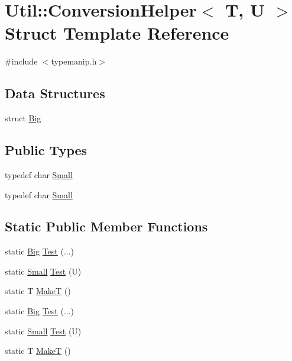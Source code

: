\hypertarget{structUtil_1_1Private_1_1ConversionHelper}{}\section{Util\+:\+:Conversion\+Helper$<$ T, U $>$ Struct Template Reference}
\label{structUtil_1_1Private_1_1ConversionHelper}


{\ttfamily \#include $<$typemanip.\+h$>$}

\subsection*{Data Structures}
\begin{DoxyCompactItemize}
\item 
struct \mbox{\hyperlink{structUtil_1_1Private_1_1ConversionHelper_1_1Big}{Big}}
\end{DoxyCompactItemize}
\subsection*{Public Types}
\begin{DoxyCompactItemize}
\item 
typedef char \mbox{\hyperlink{structUtil_1_1Private_1_1ConversionHelper_aaaf6583019b5246d4676b56923632385}{Small}}
\item 
typedef char \mbox{\hyperlink{structUtil_1_1Private_1_1ConversionHelper_aaaf6583019b5246d4676b56923632385}{Small}}
\end{DoxyCompactItemize}
\subsection*{Static Public Member Functions}
\begin{DoxyCompactItemize}
\item 
static \mbox{\hyperlink{structUtil_1_1Private_1_1ConversionHelper_1_1Big}{Big}} \mbox{\hyperlink{structUtil_1_1Private_1_1ConversionHelper_a70eb55dfb70dbf3459524083d35e350b}{Test}} (...)
\item 
static \mbox{\hyperlink{structUtil_1_1Private_1_1ConversionHelper_aaaf6583019b5246d4676b56923632385}{Small}} \mbox{\hyperlink{structUtil_1_1Private_1_1ConversionHelper_aeee49a75a44a57a9fec054caca088db9}{Test}} (U)
\item 
static T \mbox{\hyperlink{structUtil_1_1Private_1_1ConversionHelper_a5515ec18074242f117a5a1cf91ca3a7d}{MakeT}} ()
\item 
static \mbox{\hyperlink{structUtil_1_1Private_1_1ConversionHelper_1_1Big}{Big}} \mbox{\hyperlink{structUtil_1_1Private_1_1ConversionHelper_a70eb55dfb70dbf3459524083d35e350b}{Test}} (...)
\item 
static \mbox{\hyperlink{structUtil_1_1Private_1_1ConversionHelper_aaaf6583019b5246d4676b56923632385}{Small}} \mbox{\hyperlink{structUtil_1_1Private_1_1ConversionHelper_aeee49a75a44a57a9fec054caca088db9}{Test}} (U)
\item 
static T \mbox{\hyperlink{structUtil_1_1Private_1_1ConversionHelper_a5515ec18074242f117a5a1cf91ca3a7d}{MakeT}} ()
\end{DoxyCompactItemize}


